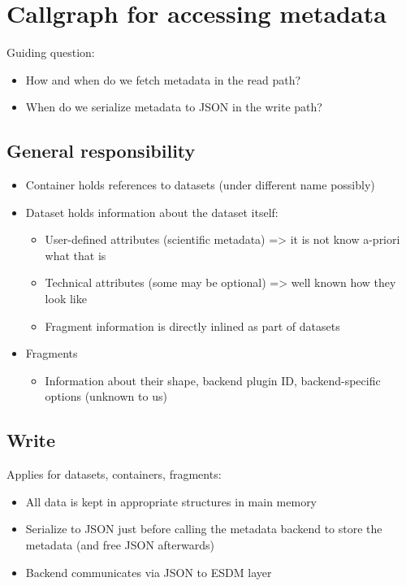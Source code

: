 \section{Callgraph for accessing metadata}%
\label{callgraph-for-accessing-metadata}

Guiding question:

\begin{itemize}
  \item How and when do we fetch metadata in the read path?
  \item When do we serialize metadata to JSON in the write path?
\end{itemize}

\subsection{General responsibility}%
\label{general-responsibility}

\begin{itemize}
  \item Container holds references to datasets (under different name possibly)
  \item Dataset holds information about the dataset itself:
    \begin{itemize}
      \item User-defined attributes (scientific metadata) =\textgreater{} it is not know a-priori what that is
      \item Technical attributes (some may be optional) =\textgreater{} well known how they look like
      \item Fragment information is directly inlined as part of datasets
    \end{itemize}
  \item Fragments
    \begin{itemize}
      \item Information about their shape, backend plugin ID, backend-specific options (unknown to us)
    \end{itemize}
\end{itemize}

\subsection{Write}%
\label{write}

Applies for datasets, containers, fragments:

\begin{itemize}
  \item All data is kept in appropriate structures in main memory
  \item Serialize to JSON just before calling the metadata backend to store the metadata (and free JSON afterwards)
  \item Backend communicates via JSON to ESDM layer
\end{itemize}

